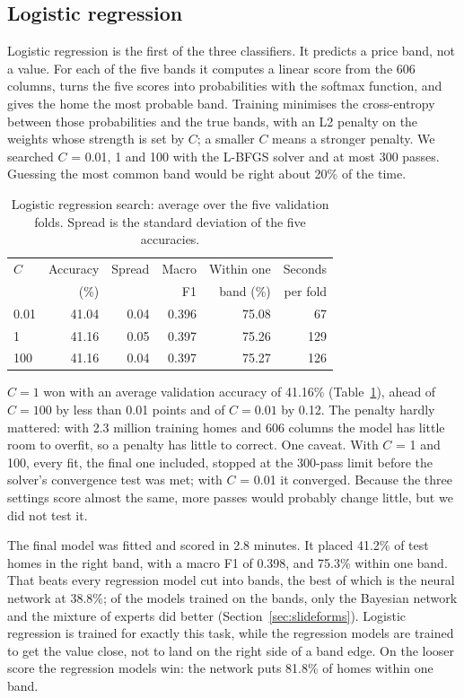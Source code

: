 \documentclass[sigconf,nonacm,10pt]{acmart}
\begin{document}
\subsection{Logistic regression}
\label{sec:logistic}
Logistic regression \cite{cox1958} is the first of the three classifiers. It predicts a price band, not a value. For each of the five bands it computes a linear score from the 606 columns, turns the five scores into probabilities with the softmax function, and gives the home the most probable band. Training minimises the cross-entropy between those probabilities and the true bands, with an L2 penalty on the weights whose strength is set by $C$; a smaller $C$ means a stronger penalty. We searched $C$ = 0.01, 1 and 100 with the L-BFGS solver and at most 300 passes. Guessing the most common band would be right about 20\% of the time.

\begin{table}[t]
\caption{Logistic regression search: average over the five validation folds. Spread is the standard deviation of the five accuracies.}
\label{tab:logistic}
\small
\setlength{\tabcolsep}{4pt}
\begin{tabular}{@{}lrrrrr@{}}
\toprule
$C$ & Accuracy & Spread & Macro & Within one & Seconds \\
 & (\%) & & F1 & band (\%) & per fold \\
\midrule
0.01 & 41.04 & 0.04 & 0.396 & 75.08 & 67 \\
1 & 41.16 & 0.05 & 0.397 & 75.26 & 129 \\
100 & 41.16 & 0.04 & 0.397 & 75.27 & 126 \\
\bottomrule
\end{tabular}
\end{table}

$C = 1$ won with an average validation accuracy of 41.16\% (Table~\ref{tab:logistic}), ahead of $C = 100$ by less than 0.01 points and of $C = 0.01$ by 0.12. The penalty hardly mattered: with 2.3 million training homes and 606 columns the model has little room to overfit, so a penalty has little to correct. One caveat. With $C$ = 1 and 100, every fit, the final one included, stopped at the 300-pass limit before the solver's convergence test was met; with $C$ = 0.01 it converged. Because the three settings score almost the same, more passes would probably change little, but we did not test it.

The final model was fitted and scored in 2.8 minutes. It placed 41.2\% of test homes in the right band, with a macro F1 of 0.398, and 75.3\% within one band. That beats every regression model cut into bands, the best of which is the neural network at 38.8\%; of the models trained on the bands, only the Bayesian network and the mixture of experts did better (Section~\ref{sec:slideforms}). Logistic regression is trained for exactly this task, while the regression models are trained to get the value close, not to land on the right side of a band edge. On the looser score the regression models win: the network puts 81.8\% of homes within one band.
\end{document}
